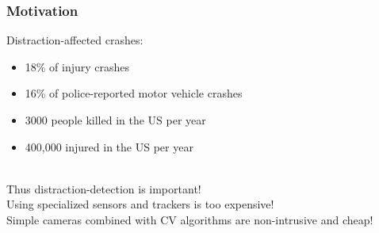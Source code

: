 \documentclass{beamer}
\begin{document}
	\begin{frame}
		\frametitle{Motivation}
		Distraction-affected crashes:
		\begin{itemize}
			\item 18\% of injury crashes
			\item 16\% of police-reported motor vehicle crashes
			\item 3000 people killed in the US per year
			\item 400,000 injured in the US per year
		\end{itemize}\\
		\vspace{0.2cm}
		Thus distraction-detection is important! \\
		\vspace{0.2cm}
		Using specialized sensors and trackers is too expensive! \\
		\vspace{0.2cm}
		Simple cameras combined with CV algorithms are non-intrusive and cheap!
	
	\end{frame}
	
\end{document}
